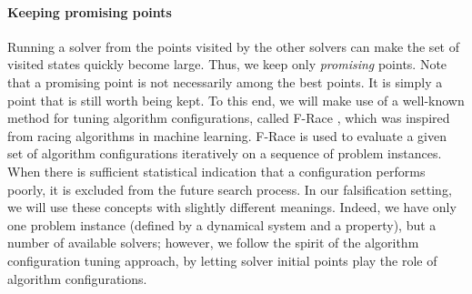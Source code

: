 \paragraph{Keeping promising points}
Running a solver from the points visited by the other solvers can make the set of visited states quickly become large. Thus, we keep only {\em promising} points. Note that a promising point is not necessarily among the best points. It is simply a point that is still worth being kept. To this end, we will make use of a well-known method for tuning algorithm configurations, called F-Race \cite{Birattari2010}, which was inspired from racing algorithms in machine learning. F-Race is used to evaluate a given set of algorithm configurations iteratively on a sequence of problem instances. When there is sufficient statistical indication that a configuration performs poorly, it is excluded from the future search process. In our falsification setting, we will use these concepts with slightly different meanings. Indeed, we have only one problem instance (defined by a dynamical system and a property), but a number of available solvers; however, we follow the spirit of the algorithm configuration tuning approach, by letting solver initial points play the role of algorithm configurations.


